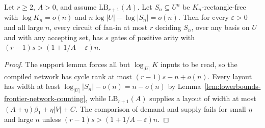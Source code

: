 \begin{theorem}
  \label{thm:lowerbounds-frontier-main}
  \leanok
  Let $r\ge2$, $A>0$, and assume $\mathrm{LB}_{r+1}(A)$. Let
  $S_n\subseteq U^n$ be $K_n$-rectangle-free with $\log K_n=o(n)$ and
  $n\log|U|-\log|S_n|=o(n)$. Then for every $\varepsilon>0$ and all large $n$,
  every circuit of fan-in at most $r$ deciding $S_n$, over any basis on $U$ and
  with any accepting set, has $s$ gates of positive arity with
  $(r-1)s>(1+1/A-\varepsilon)n$.
\end{theorem}
\begin{proof}
  \leanok
  The support lemma forces all but $\log_{|U|}K$ inputs to be read, so the
  compiled network has cycle rank at most $(r-1)s-n+o(n)$. Every layout has width
  at least $\log_{|U|}|S_n|-o(n)=n-o(n)$ by
  Lemma~\ref{lem:lowerbounds-frontier-network-counting}, while
  $\mathrm{LB}_{r+1}(A)$ supplies a layout of width at most
  $(A+\eta)\beta_1+\eta|V|+C$. The comparison of demand and supply fails for
  small $\eta$ and large $n$ unless $(r-1)s>(1+1/A-\varepsilon)n$.
\end{proof}

